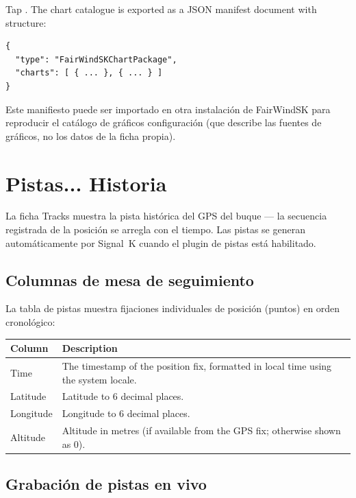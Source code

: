 Tap . The chart catalogue is exported as a JSON manifest document with structure:

\begin{lstlisting}
{
  "type": "FairWindSKChartPackage",
  "charts": [ { ... }, { ... } ]
}
\end{lstlisting}

Este manifiesto puede ser importado en otra instalación de FairWindSK para reproducir el catálogo de gráficos
configuración (que describe las fuentes de gráficos, no los datos de la ficha propia).

\chapter{Pistas... Historia}
\label{ch:tracks}

La ficha Tracks muestra la pista histórica del GPS del buque --- la secuencia registrada de la posición
se arregla con el tiempo.
Las pistas se generan automáticamente por Signal~K cuando el plugin de pistas está habilitado.


\section{Columnas de mesa de seguimiento}

La tabla de pistas muestra fijaciones individuales de posición (puntos) en orden cronológico:

\begin{longtable}{L{2.4cm} L{11.3cm}}
\toprule
{}
{\sffamily\bfseries\color{white} Column} &
{\sffamily\bfseries\color{white} Description} \\
\midrule
Time & The timestamp of the position fix, formatted in local time using the system locale. \\
Latitude & Latitude to 6 decimal places. \\
Longitude & Longitude to 6 decimal places. \\
Altitude & Altitude in metres (if available from the GPS fix; otherwise shown as 0). \\
\bottomrule
\end{longtable}

\section{Grabación de pistas en vivo}

